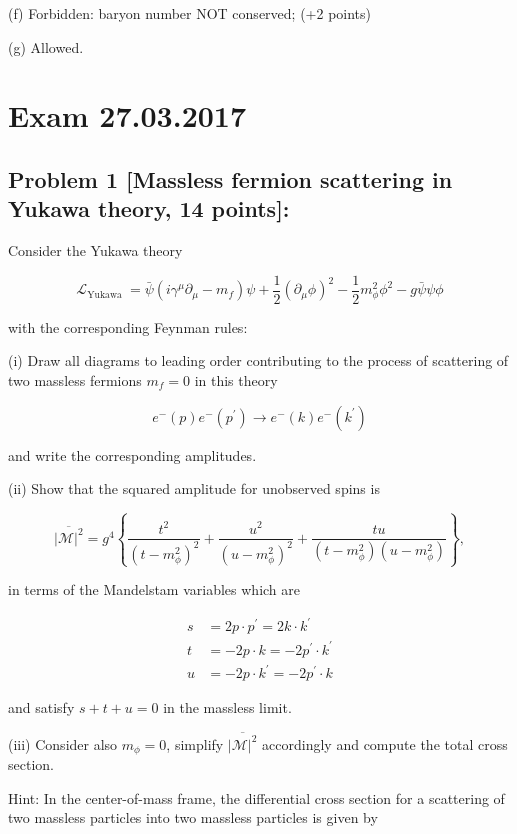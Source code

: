 \documentclass[10pt, letterpaper]{article}
\begin{document}
(f) Forbidden: baryon number NOT conserved; (+2 points)

(g) Allowed.

\pagebreak

\section{Exam 27.03.2017}


\subsection{Problem 1 [Massless fermion scattering in Yukawa theory, 14 points]:}

Consider the Yukawa theory

$$
\mathcal{L}_{\text {Yukawa }}=\bar{\psi}\left(i \gamma^\mu \partial_\mu-m_f\right) \psi+\frac{1}{2}\left(\partial_\mu \phi\right)^2-\frac{1}{2} m_\phi^2 \phi^2-g \bar{\psi} \psi \phi
$$

with the corresponding Feynman rules:

(i) Draw all diagrams to leading order contributing to the process of scattering of two massless fermions $m_f=0$ in this theory

$$
e^{-}(p) e^{-}\left(p^{\prime}\right) \longrightarrow e^{-}(k) e^{-}\left(k^{\prime}\right)
$$

and write the corresponding amplitudes.


(ii) Show that the squared amplitude for unobserved spins is

$$
\overline{|\mathcal{M}|^2}=g^4\left\{\frac{t^2}{\left(t-m_\phi^2\right)^2}+\frac{u^2}{\left(u-m_\phi^2\right)^2}+\frac{t u}{\left(t-m_\phi^2\right)\left(u-m_\phi^2\right)}\right\},
$$

in terms of the Mandelstam variables which are

$$
\begin{aligned}
s & =2 p \cdot p^{\prime}=2 k \cdot k^{\prime} \\
t & =-2 p \cdot k=-2 p^{\prime} \cdot k^{\prime} \\
u & =-2 p \cdot k^{\prime}=-2 p^{\prime} \cdot k
\end{aligned}
$$

and satisfy $s+t+u=0$ in the massless limit.


(iii) Consider also $m_\phi=0$, simplify $\overline{|\mathcal{M}|^2}$ accordingly and compute the total cross section.

Hint: In the center-of-mass frame, the differential cross section for a scattering of two massless particles into two massless particles is given by
\end{document}
